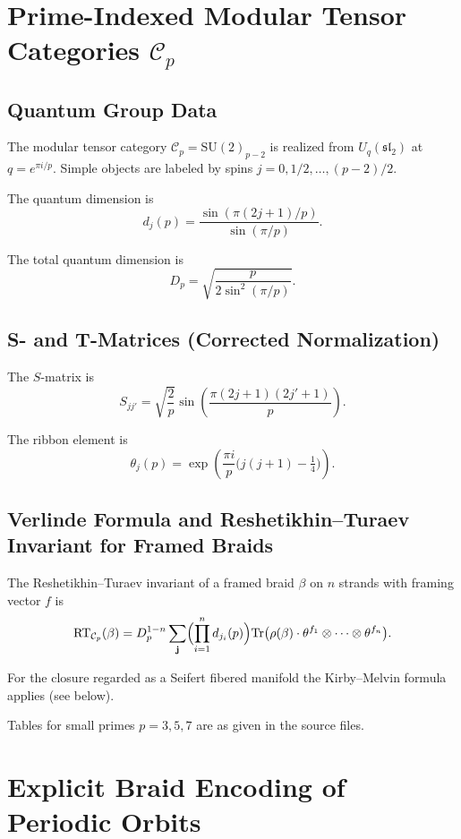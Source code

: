 \documentclass[11pt,a4paper]{amsart}
\begin{document}
\section{Prime-Indexed Modular Tensor Categories \(\mathcal{C}_p\)}
\label{sec:mtc}

\subsection{Quantum Group Data}

The modular tensor category \(\mathcal{C}_p = \mathrm{SU}(2)_{p-2}\) is realized from \(U_q(\mathfrak{sl}_2)\) at \(q = e^{\pi i / p}\). Simple objects are labeled by spins \(j = 0, 1/2, \dots, (p-2)/2\).

The quantum dimension is
\[
d_j(p) = \frac{\sin(\pi(2j+1)/p)}{\sin(\pi/p)}.
\]

The total quantum dimension is
\[
D_p = \sqrt{\frac{p}{2\sin^2(\pi/p)}}.
\]

\subsection{S- and T-Matrices (Corrected Normalization)}

The \(S\)-matrix is
\[
S_{jj'} = \sqrt{\frac{2}{p}} \sin\left( \frac{\pi(2j+1)(2j'+1)}{p} \right).
\]

The ribbon element is
\[
\theta_j(p) = \exp\left( \frac{\pi i}{p} \bigl( j(j+1) - \tfrac14 \bigr) \right).
\]

\subsection{Verlinde Formula and Reshetikhin--Turaev Invariant for Framed Braids}

The Reshetikhin--Turaev invariant of a framed braid \(\beta\) on \(n\) strands with framing vector \(f\) is
\[
\mathrm{RT}_{\mathcal{C}_p}(\beta) = D_p^{1-n} \sum_{\mathbf{j}} \Bigl( \prod_{i=1}^n d_{j_i}(p) \Bigr) \mathrm{Tr} \bigl( \rho(\beta) \cdot \theta^{f_1} \otimes \cdots \otimes \theta^{f_n} \bigr).
\]

For the closure regarded as a Seifert fibered manifold the Kirby--Melvin formula applies (see below).

Tables for small primes \(p=3,5,7\) are as given in the source files.

\section{Explicit Braid Encoding of Periodic Orbits}
\label{sec:braid}
\end{document}
